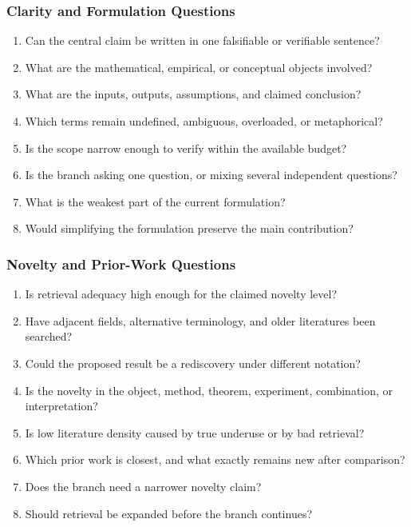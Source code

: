 \documentclass[11pt]{article}
\begin{document}
\subsubsection*{Clarity and Formulation Questions}
\begin{enumerate}[leftmargin=*]
    \item Can the central claim be written in one falsifiable or verifiable sentence?
    \item What are the mathematical, empirical, or conceptual objects involved?
    \item What are the inputs, outputs, assumptions, and claimed conclusion?
    \item Which terms remain undefined, ambiguous, overloaded, or metaphorical?
    \item Is the scope narrow enough to verify within the available budget?
    \item Is the branch asking one question, or mixing several independent questions?
    \item What is the weakest part of the current formulation?
    \item Would simplifying the formulation preserve the main contribution?
\end{enumerate}

\subsubsection*{Novelty and Prior-Work Questions}
\begin{enumerate}[leftmargin=*]
    \item Is retrieval adequacy high enough for the claimed novelty level?
    \item Have adjacent fields, alternative terminology, and older literatures been searched?
    \item Could the proposed result be a rediscovery under different notation?
    \item Is the novelty in the object, method, theorem, experiment, combination, or interpretation?
    \item Is low literature density caused by true underuse or by bad retrieval?
    \item Which prior work is closest, and what exactly remains new after comparison?
    \item Does the branch need a narrower novelty claim?
    \item Should retrieval be expanded before the branch continues?
\end{enumerate}
\end{document}
